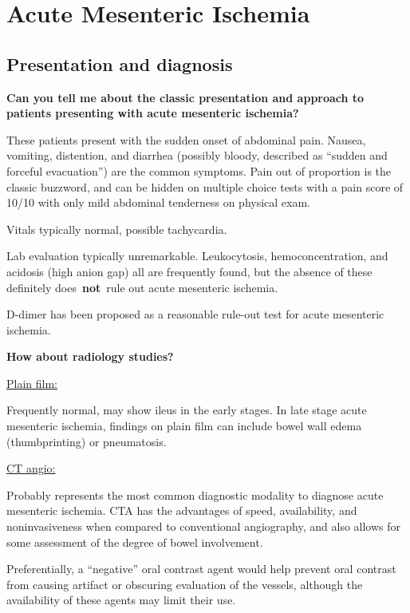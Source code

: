 \documentclass[
]{book}
\begin{document}
\hypertarget{acute-mesenteric-ischemia}{%
\section{Acute Mesenteric Ischemia}\label{acute-mesenteric-ischemia}}

\hypertarget{presentation-and-diagnosis-1}{%
\subsection{Presentation and diagnosis}\label{presentation-and-diagnosis-1}}

\textbf{Can you tell me about the classic presentation and approach to
patients presenting with acute mesenteric ischemia?}

These patients present with the sudden onset of abdominal pain. Nausea,
vomiting, distention, and diarrhea (possibly bloody, described as
``sudden and forceful evacuation'') are the common symptoms. Pain out of
proportion is the classic buzzword, and can be hidden on multiple choice
tests with a pain score of 10/10 with only mild abdominal tenderness on
physical exam.

Vitals typically normal, possible tachycardia.

Lab evaluation typically unremarkable. Leukocytosis, hemoconcentration,
and acidosis (high anion gap) all are frequently found, but the absence
of these definitely does~\textbf{not}~rule out acute mesenteric ischemia.

D-dimer has been proposed as a reasonable rule-out test for acute
mesenteric ischemia.

\textbf{How about radiology studies?}

\underline{Plain film:}

Frequently normal, may show ileus in the early stages. In late stage
acute mesenteric ischemia, findings on plain film can include bowel wall
edema (thumbprinting) or pneumatosis.

\underline{CT angio:}

Probably represents the most common diagnostic modality to diagnose
acute mesenteric ischemia. CTA has the advantages of speed,
availability, and noninvasiveness when compared to conventional
angiography, and also allows for some assessment of the degree of bowel
involvement.~

Preferentially, a ``negative'' oral contrast agent would help prevent oral
contrast from causing artifact or obscuring evaluation of the vessels,
although the availability of these agents may limit their use.
\end{document}
